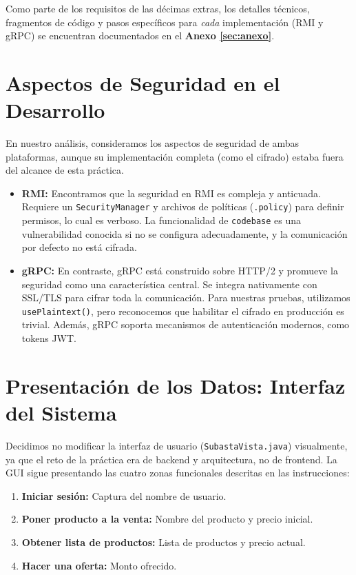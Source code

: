 \documentclass[11pt, a4paper]{article}
\begin{document}
Como parte de los requisitos de las décimas extras, los detalles técnicos, fragmentos de código y pasos específicos para \textit{cada} implementación (RMI y gRPC) se encuentran documentados en el \textbf{Anexo \ref{sec:anexo}}.

\section{Aspectos de Seguridad en el Desarrollo}
\label{sec:seguridad}

En nuestro análisis, consideramos los aspectos de seguridad de ambas plataformas, aunque su implementación completa (como el cifrado) estaba fuera del alcance de esta práctica.

\begin{itemize}
    \item \textbf{RMI:} Encontramos que la seguridad en RMI es compleja y anticuada.
Requiere un \texttt{SecurityManager} y archivos de políticas (\texttt{.policy}) para definir permisos, lo cual es verboso.
La funcionalidad de \texttt{codebase} es una vulnerabilidad conocida si no se configura adecuadamente, y la comunicación por defecto no está cifrada.
\item \textbf{gRPC:} En contraste, gRPC está construido sobre HTTP/2 y promueve la seguridad como una característica central.
Se integra nativamente con SSL/TLS para cifrar toda la comunicación.
Para nuestras pruebas, utilizamos \texttt{usePlaintext()}, pero reconocemos que habilitar el cifrado en producción es trivial.
Además, gRPC soporta mecanismos de autenticación modernos, como tokens JWT.
\end{itemize}

\section{Presentación de los Datos: Interfaz del Sistema}
\label{sec:interfaz}

Decidimos no modificar la interfaz de usuario (\texttt{SubastaVista.java}) visualmente, ya que el reto de la práctica era de backend y arquitectura, no de frontend.
La GUI sigue presentando las cuatro zonas funcionales descritas en las instrucciones:
\begin{enumerate}
    \item \textbf{Iniciar sesión:} Captura del nombre de usuario.
\item \textbf{Poner producto a la venta:} Nombre del producto y precio inicial.
    \item \textbf{Obtener lista de productos:} Lista de productos y precio actual.
\item \textbf{Hacer una oferta:} Monto ofrecido.
\end{enumerate}
\end{document}
